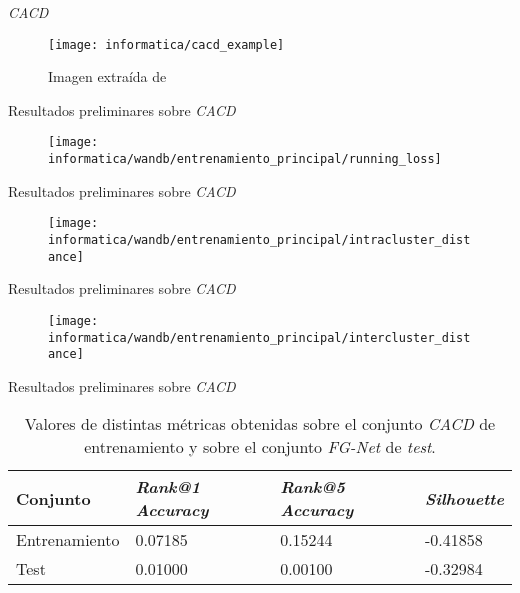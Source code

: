 \begin{frame}{\textit{CACD}}

	\begin{figure}
		\texttt{[image: informatica/cacd\_example]}
		\caption{Imagen extraída de \cite{informatica:paper_cacd}}
		\label{img:cacd_imagenes_ejemplo}
	\end{figure}

\end{frame}

\begin{frame}{Resultados preliminares sobre \textit{CACD}}
	\begin{figure}
		\texttt{[image: informatica/wandb/entrenamiento\_principal/running\_loss]}
	\end{figure}
\end{frame}

\begin{frame}{Resultados preliminares sobre \textit{CACD}}
	\begin{figure}
		\texttt{[image: informatica/wandb/entrenamiento\_principal/intracluster\_distance]}
	\end{figure}
\end{frame}

\begin{frame}{Resultados preliminares sobre \textit{CACD}}
	\begin{figure}
		\texttt{[image: informatica/wandb/entrenamiento\_principal/intercluster\_distance]}
	\end{figure}

\end{frame}

\begin{frame}{Resultados preliminares sobre \textit{CACD}}
	\begin{table}
		\centering
		\begin{tabular}{|l|l|l|l|}
			\hline
			Conjunto      & \textit{Rank@1 Accuracy} & \textit{Rank@5 Accuracy} & \textit{Silhouette} \\
			\hline

			Entrenamiento & 0.07185                  & 0.15244                  & -0.41858            \\
			Test          & 0.01000                  & 0.00100                  & -0.32984            \\
			\hline
		\end{tabular}
		\caption{Valores de distintas métricas obtenidas sobre el conjunto \textit{CACD} de entrenamiento y sobre el conjunto \textit{FG-Net} de \textit{test}.}
		\label{table:resultados_sobre_fg_net}
	\end{table}

\end{frame}

